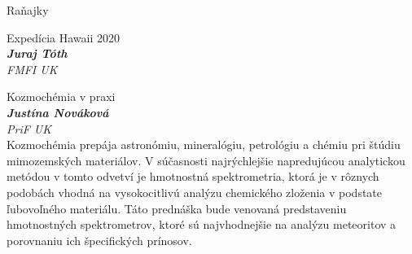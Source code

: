 \documentclass[a4paper]{report}
\begin{document}
                    \begin{tcolorbox}[
                                    colback=red!10,
                    colframe=red!50!black,
                                fonttitle=\Large\bfseries,
                title=09:00
            ]
                {\Large Raňajky}
                                            \end{tcolorbox}
                    \begin{tcolorbox}[
                                    colback=white,
                    colframe=black!70!white,
                                fonttitle=\Large\bfseries,
                title=10:00
            ]
                {\Large Expedícia Hawaii 2020}
                                                            \\ \textbf{\textit{Juraj Tóth}}
                                        \\ \textit{FMFI UK}                                            \end{tcolorbox}
                    \begin{tcolorbox}[
                                    colback=white,
                    colframe=black!70!white,
                                fonttitle=\Large\bfseries,
                title=10:30
            ]
                {\Large Kozmochémia v praxi}
                                                            \\ \textbf{\textit{Justína Nováková}}
                                        \\ \textit{PriF UK}                                \\[2ex]Kozmochémia prepája astronómiu, mineralógiu, petrológiu a chémiu pri štúdiu mimozemských materiálov. V súčasnosti najrýchlejšie napredujúcou analytickou metódou v tomto odvetví je hmotnostná spektrometria, ktorá je v rôznych podobách vhodná na vysokocitlivú analýzu chemického zloženia v podstate ľubovoľného materiálu. Táto prednáška bude venovaná predstaveniu hmotnostných spektrometrov, ktoré sú najvhodnejšie na analýzu meteoritov a porovnaniu ich špecifických prínosov.
            \end{tcolorbox}
\end{document}
